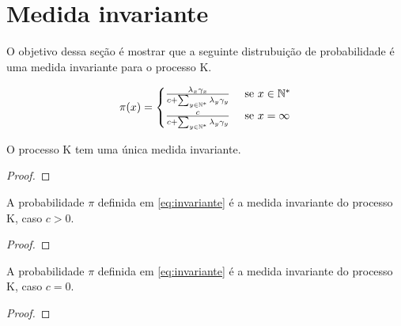 
\section{Medida invariante}
\label{sec:invariante}

O objetivo dessa seção é mostrar que a seguinte distrubuição de
probabilidade é uma medida invariante para o processo K.

\begin{equation}
  \label{eq:invariante}
  \pi(x) = \begin{cases}
    \frac{\lambda_x \gamma_x}{c + \sum_{y \in {\mathbb{N^*}}} \lambda_y \gamma_y}
    & \textrm{ se } x \in {\mathbb{N^*}} \\
    \frac{c}{c + \sum_{y \in {\mathbb{N^*}}} \lambda_y \gamma_y}
    & \textrm{ se } x = \infty \\
  \end{cases}
\end{equation}

\begin{proposicao}
  O processo K tem uma única medida invariante.
\end{proposicao}
\begin{proof}
  
\end{proof}


\begin{proposicao}
  A probabilidade $\pi$ definida em \ref{eq:invariante} é a medida
  invariante do processo K, caso $c > 0$.
\end{proposicao}
\begin{proof}
  
\end{proof}

\begin{proposicao}
  A probabilidade $\pi$ definida em \ref{eq:invariante} é a medida
  invariante do processo K, caso $c = 0$.
\end{proposicao}
\begin{proof}
  
\end{proof}


